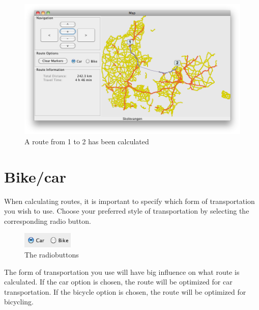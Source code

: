 \begin{figure}[h!]
\centering
\includegraphics[width=1\linewidth]{images/man-route.png}
\caption{A route from 1 to 2 has been calculated}
\label{MAN-RF-IMG}
\end{figure}

\section{Bike/car}
\label{MAN-BC}
When calculating routes, it is important to specify which form of
transportation you wish to use. Choose your preferred style of transportation by
selecting the corresponding radio button.

\begin{figure}[h!]
\centering
\includegraphics[height=2em]{images/radiobuttons.png}
\caption{The radiobuttons}
\label{MAN-BC-IMG}
\end{figure}

The form of transportation you use will have big influence on what route is
calculated. If the car option is chosen, the route will be optimized for car
transportation. If the bicycle option is chosen, the route will be optimized for
bicycling.

